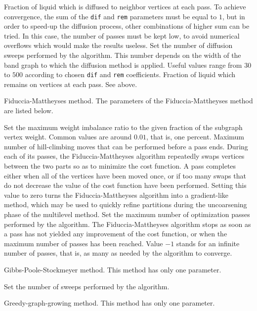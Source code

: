 \begin{itemize}
\begin{itemize}
\iteme[{\tt dif=}{\it rat}]
Fraction of liquid which is diffused to neighbor vertices at each
pass. To achieve convergence, the sum of the {\tt dif} and {\tt rem}
parameters must be equal to $1$, but in order to speed-up the diffusion
process, other combinations of higher sum can be tried. In this case,
the number of passes must be kept low, to avoid numerical overflows
which would make the results useless.
\iteme[{\tt pass=}{\it nbr}]
Set the number of diffusion sweeps performed by the algorithm. This
number depends on the width of the band graph to which the diffusion
method is applied. Useful values range from $30$ to $500$ according
to chosen {\tt dif} and {\tt rem} coefficients.
\iteme[{\tt rem=}{\it rat}]
Fraction of liquid which remains on vertices at each pass. See above.
\end{itemize}
\iteme[{\tt f}]
Fiduccia-Mattheyses method. The parameters of the Fiduccia-Mattheyses method
are listed below.
\begin{itemize}
\iteme[{\tt bal=}{\it rat}]
Set the maximum weight imbalance ratio to the given fraction of
the subgraph vertex weight. Common values are around $0.01$, that
is, one percent.
\iteme[{\tt move=}{\it nbr}]
Maximum number of hill-climbing moves that can be performed before a
pass ends. During each of its passes, the Fiduccia-Mattheyses
algorithm repeatedly swaps vertices between the two parts so as to
minimize the cost function. A pass completes either when all of the
vertices have been moved once, or if too many swaps that do not
decrease the value of the cost function have been performed. Setting
this value to zero turns the Fiduccia-Mattheyses algorithm into a
gradient-like method, which may be used to quickly refine partitions
during the uncoarsening phase of the multilevel method.
\iteme[{\tt pass=}{\it nbr}]
Set the maximum number of optimization passes performed by the
algorithm. The Fiduccia-Mattheyses algorithm stops as soon as a pass
has not yielded any improvement of the cost function, or when the
maximum number of passes has been reached. Value $-1$ stands for an
infinite number of passes, that is, as many as needed by the algorithm
to converge.
\end{itemize}
\iteme[{\tt g}]
Gibbs-Poole-Stockmeyer method. This method has only one parameter.
\begin{itemize}
\iteme[{\tt pass=}{\it nbr}]
Set the number of sweeps performed by the algorithm.
\end{itemize}
\iteme[{\tt h}]
Greedy-graph-growing method. This method has only one parameter.
\begin{itemize}

\end{itemize}
\end{itemize}
